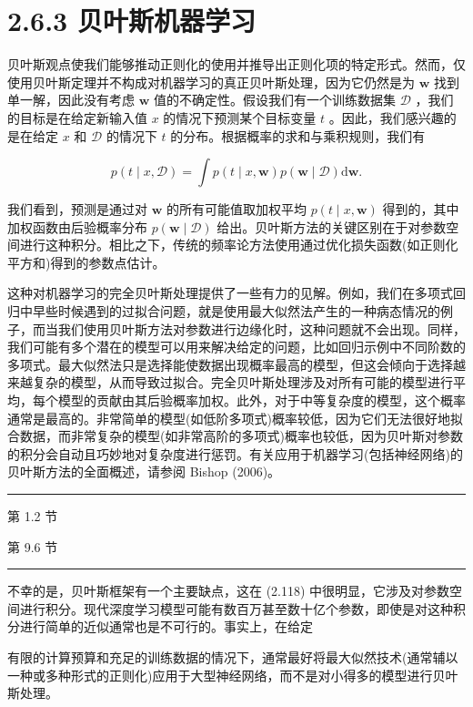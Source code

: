 \documentclass[10pt]{report}
\newcommand{\HRule}{\begin{center}\rule{0.9\linewidth}{0.2mm}\end{center}}
\begin{document}
\section*{2.6.3 贝叶斯机器学习}

贝叶斯观点使我们能够推动正则化的使用并推导出正则化项的特定形式。然而，仅使用贝叶斯定理并不构成对机器学习的真正贝叶斯处理，因为它仍然是为 \(\mathbf{w}\) 找到单一解，因此没有考虑 \(\mathbf{w}\) 值的不确定性。假设我们有一个训练数据集 \(\mathcal{D}\) ，我们的目标是在给定新输入值 \(x\) 的情况下预测某个目标变量 \(t\) 。因此，我们感兴趣的是在给定 \(x\) 和 \(\mathcal{D}\) 的情况下 \(t\) 的分布。根据概率的求和与乘积规则，我们有

\[
p\left( {t \mid  x,\mathcal{D}}\right)  = \int p\left( {t \mid  x,\mathbf{w}}\right) p\left( {\mathbf{w} \mid  \mathcal{D}}\right) \mathrm{d}\mathbf{w}. \tag{2.118}
\]

我们看到，预测是通过对 \(\mathbf{w}\) 的所有可能值取加权平均 \(p\left( {t \mid  x,\mathbf{w}}\right)\) 得到的，其中加权函数由后验概率分布 \(p\left( {\mathbf{w} \mid  \mathcal{D}}\right)\) 给出。贝叶斯方法的关键区别在于对参数空间进行这种积分。相比之下，传统的频率论方法使用通过优化损失函数(如正则化平方和)得到的参数点估计。

这种对机器学习的完全贝叶斯处理提供了一些有力的见解。例如，我们在多项式回归中早些时候遇到的过拟合问题，就是使用最大似然法产生的一种病态情况的例子，而当我们使用贝叶斯方法对参数进行边缘化时，这种问题就不会出现。同样，我们可能有多个潜在的模型可以用来解决给定的问题，比如回归示例中不同阶数的多项式。最大似然法只是选择能使数据出现概率最高的模型，但这会倾向于选择越来越复杂的模型，从而导致过拟合。完全贝叶斯处理涉及对所有可能的模型进行平均，每个模型的贡献由其后验概率加权。此外，对于中等复杂度的模型，这个概率通常是最高的。非常简单的模型(如低阶多项式)概率较低，因为它们无法很好地拟合数据，而非常复杂的模型(如非常高阶的多项式)概率也较低，因为贝叶斯对参数的积分会自动且巧妙地对复杂度进行惩罚。有关应用于机器学习(包括神经网络)的贝叶斯方法的全面概述，请参阅 Bishop (2006)。

\HRule

第 1.2 节

第 9.6 节

\HRule

不幸的是，贝叶斯框架有一个主要缺点，这在 (2.118) 中很明显，它涉及对参数空间进行积分。现代深度学习模型可能有数百万甚至数十亿个参数，即使是对这种积分进行简单的近似通常也是不可行的。事实上，在给定

有限的计算预算和充足的训练数据的情况下，通常最好将最大似然技术(通常辅以一种或多种形式的正则化)应用于大型神经网络，而不是对小得多的模型进行贝叶斯处理。
\end{document}
